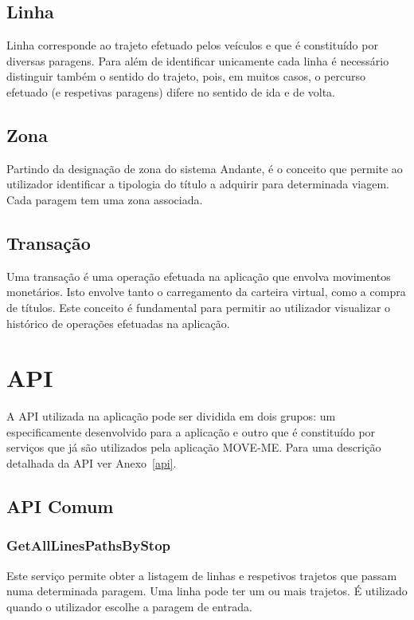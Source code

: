 \subsection{Linha}
Linha corresponde ao trajeto efetuado pelos veículos e que é constituído por diversas paragens. Para além de identificar unicamente cada linha é necessário distinguir também o sentido do trajeto, pois, em muitos casos, o percurso efetuado (e respetivas paragens) difere no sentido de ida e de volta.

\subsection{Zona}
Partindo da designação de zona do sistema Andante, é o conceito que permite ao utilizador identificar a tipologia do título a adquirir para determinada viagem. Cada paragem tem uma zona associada.

\subsection{Transação}
Uma transação é uma operação efetuada na aplicação que envolva movimentos monetários. Isto envolve tanto o carregamento da carteira virtual, como a compra de títulos. Este conceito é fundamental para permitir ao utilizador visualizar o histórico de operações efetuadas na aplicação.

\section{API}

A API utilizada na aplicação pode ser dividida em dois grupos: um especificamente desenvolvido para a aplicação e outro que é constituído por serviços que já são utilizados pela aplicação MOVE-ME. Para uma descrição detalhada da API ver Anexo~\ref{api}.

\subsection{API Comum}

\subsubsection{GetAllLinesPathsByStop}

Este serviço permite obter a listagem de linhas e respetivos trajetos que passam numa determinada paragem. Uma linha pode ter um ou mais trajetos. É utilizado quando o utilizador escolhe a paragem de entrada.

